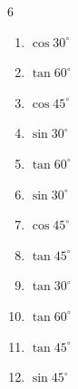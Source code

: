 \begin{multicols}{6}
\begin{enumerate}
        \phantom{$\displaystyle =1$}

  \item $\displaystyle \cos{30^\circ}$


  \item $\displaystyle \tan{60^\circ}$


  \item $\displaystyle \cos{45^\circ}$


  \item $\displaystyle \sin{30^\circ}$


  \item $\displaystyle \tan{60^\circ}$


  \item $\displaystyle \sin{30^\circ}$


  \item $\displaystyle \cos{45^\circ}$


  \item $\displaystyle \tan{45^\circ}$

        \phantom{$\displaystyle =1$}

\columnbreak %

  \item $\displaystyle \tan{30^\circ}$


  \item $\displaystyle \tan{60^\circ}$


  \item $\displaystyle \tan{45^\circ}$

        \phantom{$\displaystyle =1$}

  \item $\displaystyle \sin{45^\circ}$



\end{enumerate}
\end{multicols}
